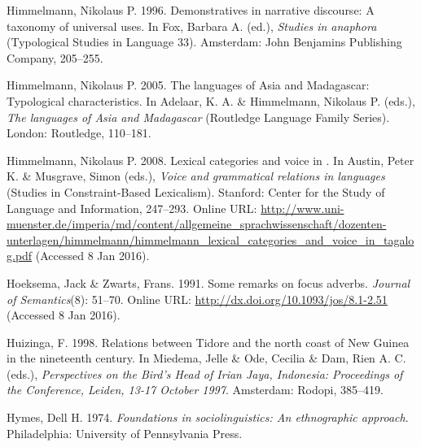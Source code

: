 \begin{styleCitaviBibliographyEntry}
Himmelmann, Nikolaus P. 1996. Demonstratives in narrative discourse: A taxonomy of universal uses. In Fox, Barbara A. (ed.), \textit{Studies in anaphora} (Typological Studies in Language 33). Amsterdam: John Benjamins Publishing Company, 205–255.
\end{styleCitaviBibliographyEntry}

\begin{styleCitaviBibliographyEntry}
Himmelmann, Nikolaus P. 2005. The  languages of Asia and Madagascar: Typological characteristics. In Adelaar, K. A. \& Himmelmann, Nikolaus P. (eds.), \textit{The  languages of Asia and Madagascar} (Routledge Language Family Series). London: Routledge, 110–181.
\end{styleCitaviBibliographyEntry}

\begin{styleCitaviBibliographyEntry}
Himmelmann, Nikolaus P. 2008. Lexical categories and voice in . In Austin, Peter K. \& Musgrave, Simon (eds.), \textit{Voice and grammatical relations in  languages} (Studies in Constraint-Based Lexicalism). Stanford: Center for the Study of Language and Information, 247–293. Online URL: \url{http://www.uni-muenster.de/imperia/md/content/allgemeine_sprachwissenschaft/dozenten-unterlagen/himmelmann/himmelmann_lexical_categories_and_voice_in_tagalog.pdf} (Accessed 8 Jan 2016).
\end{styleCitaviBibliographyEntry}

\begin{styleCitaviBibliographyEntry}
Hoeksema, Jack \& Zwarts, Frans. 1991. Some remarks on focus adverbs. \textit{Journal of Semantics}(8): 51–70. Online URL: \url{http://dx.doi.org/10.1093/jos/8.1-2.51} (Accessed 8 Jan 2016).
\end{styleCitaviBibliographyEntry}

\begin{styleCitaviBibliographyEntry}
Huizinga, F. 1998. Relations between Tidore and the north coast of New Guinea in the nineteenth century. In Miedema, Jelle \& Ode, Cecilia \& Dam, Rien A. C. (eds.), \textit{Perspectives on the Bird’s Head of Irian Jaya, Indonesia: Proceedings of the Conference, Leiden, 13-17 October 1997}. Amsterdam: Rodopi, 385–419.
\end{styleCitaviBibliographyEntry}

\begin{styleCitaviBibliographyEntry}
Hymes, Dell H. 1974. \textit{Foundations in sociolinguistics: An ethnographic approach}. Philadelphia: University of Pennsylvania Press.
\end{styleCitaviBibliographyEntry}

